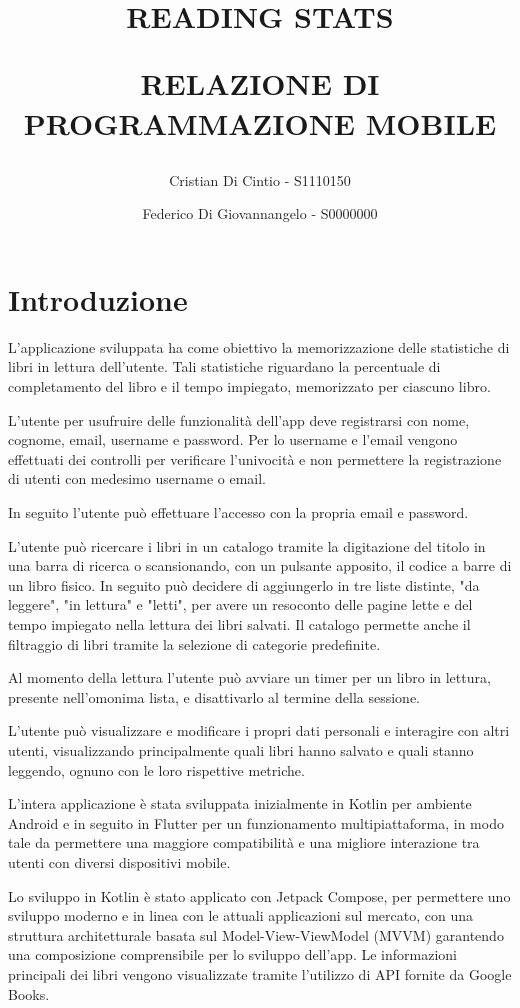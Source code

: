 \documentclass{article}
\author{Cristian Di Cintio - S1110150 \and Federico Di Giovannangelo - S0000000}
\date{}
\title{READING STATS\par \large RELAZIONE DI PROGRAMMAZIONE MOBILE}
\begin{document}
\maketitle
\tableofcontents
\newpage

\section{Introduzione}

L'applicazione sviluppata ha come obiettivo la memorizzazione delle statistiche di libri in lettura dell'utente. Tali statistiche riguardano la percentuale di completamento del libro e il tempo impiegato, memorizzato per ciascuno libro.

L'utente per usufruire delle funzionalità dell'app deve registrarsi con nome, cognome, email, username e password. Per lo username e l'email vengono effettuati dei controlli per verificare l'univocità e non permettere la registrazione di utenti con medesimo username o email.

In seguito l'utente può effettuare l'accesso con la propria email e password.

L'utente può ricercare i libri in un catalogo tramite la digitazione del titolo in una barra di ricerca o scansionando, con un pulsante apposito, il codice a barre di un libro fisico. In seguito può decidere di aggiungerlo in tre liste distinte, "da leggere", "in lettura" e "letti", 
per avere un resoconto delle pagine lette e del tempo impiegato nella lettura dei libri salvati. Il catalogo permette anche il filtraggio di libri tramite la selezione di categorie predefinite.

Al momento della lettura l'utente può avviare un timer per un libro in lettura, presente nell'omonima lista, e disattivarlo al termine della sessione.

L'utente può visualizzare e modificare i propri dati personali e interagire con altri utenti, visualizzando principalmente quali libri hanno salvato e quali stanno leggendo, ognuno con le loro rispettive metriche.

L'intera applicazione è stata sviluppata inizialmente in Kotlin per ambiente Android e in seguito in Flutter per un funzionamento multipiattaforma, in modo tale da permettere una maggiore compatibilità e una migliore interazione tra utenti con diversi dispositivi mobile.

Lo sviluppo in Kotlin è stato applicato con Jetpack Compose, per permettere uno sviluppo moderno e in linea con le attuali applicazioni sul mercato, con una struttura architetturale basata sul Model-View-ViewModel (MVVM) garantendo una composizione comprensibile per lo sviluppo dell'app.
Le informazioni principali dei libri vengono visualizzate tramite l'utilizzo di API fornite da Google Books.
\end{document}
